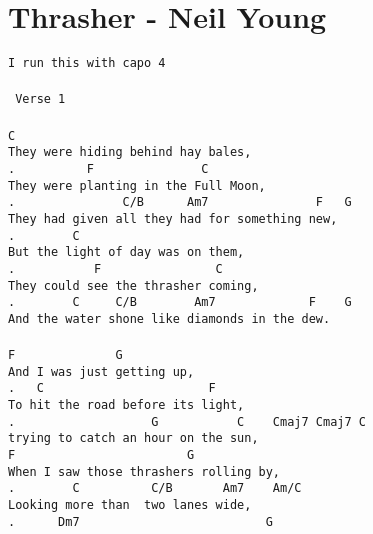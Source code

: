 \newpage
\section{Thrasher - Neil Young}
\label{Thrasher - Neil Young}
\texttt{I run this with capo 4\\
\\
\lbrack\ Verse\ 1\rbrack\\
\\
C\\
They\ were\ hiding\ behind\ hay\ bales,\\
.\ \ \ \ \ \ \ \ \ \ F\ \ \ \ \ \ \ \ \ \ \ \ \ \ \ C\ \\
They\ were\ planting\ in\ the\ Full\ Moon,\\
.\ \ \ \ \ \ \ \ \ \ \ \ \ \ \ C/B\ \ \ \ \ \ Am7\ \ \ \ \ \ \ \ \ \ \ \ \ \ \ F\ \ \ G\\
They\ had\ given\ all\ they\ had\ for\ something\ new,\\
.\ \ \ \ \ \ \ \ C\ \ \\
But\ the\ light\ of\ day\ was\ on\ them,\\
.\ \ \ \ \ \ \ \ \ \ \ F\ \ \ \ \ \ \ \ \ \ \ \ \ \ \ \ C\\
They\ could\ see\ the\ thrasher\ coming,\\
.\ \ \ \ \ \ \ \ C\ \ \ \ \ C/B\ \ \ \ \ \ \ \ Am7\ \ \ \ \ \ \ \ \ \ \ \ \ F\ \ \ \ G\ \ \ \\
And\ the\ water\ shone\ like\ diamonds\ in\ the\ dew.\\
\\
F\ \ \ \ \ \ \ \ \ \ \ \ \ \ G\\
And\ I\ was\ just\ getting\ up,\\
.\ \ \ C\ \ \ \ \ \ \ \ \ \ \ \ \ \ \ \ \ \ \ \ \ \ \ F\ \\
To\ hit\ the\ road\ before\ its\ light,\\
.\ \ \ \ \ \ \ \ \ \ \ \ \ \ \ \ \ \ \ G\ \ \ \ \ \ \ \ \ \ \ C\ \ \ \ Cmaj7\ Cmaj7\ C\ \\
trying\ to\ catch\ an\ hour\ on\ the\ sun,\\
F\ \ \ \ \ \ \ \ \ \ \ \ \ \ \ \ \ \ \ \ \ \ \ \ G\ \\
When\ I\ saw\ those\ thrashers\ rolling\ by,\\
.\ \ \ \ \ \ \ \ C\ \ \ \ \ \ \ \ \ \ C/B\ \ \ \ \ \ \ Am7\ \ \ \ Am/C\\
Looking\ more\ than\ \ two\ lanes\ wide,\\
.\ \ \ \ \ \ Dm7\ \ \ \ \ \ \ \ \ \ \ \ \ \ \ \ \ \ \ \ \ \ \ \ \ \ G\\
}

